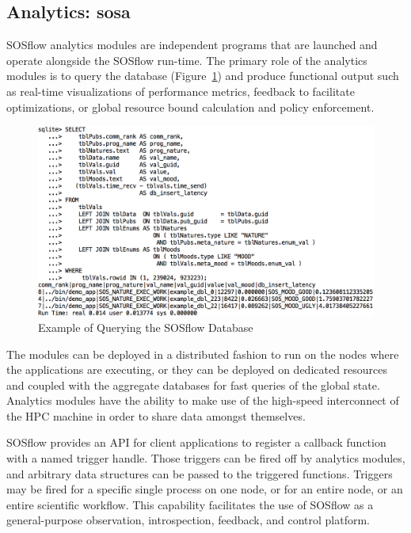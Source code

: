 \subsection{Analytics: sosa} %
%
SOSflow analytics modules are independent programs that are launched
and operate alongside the SOSflow run-time.
%
The primary role of the analytics modules is to query the database
(Figure~\ref{example_query}) and produce functional output such as
real-time visualizations of performance metrics, feedback to
facilitate optimizations, or global resource bound calculation and
policy enforcement.
%
\begin{figure}[h]
\centering
\includegraphics[width=\columnwidth]{images/query_example.png}
\caption{Example of Querying the SOSflow Database}
\label{example_query}
\end{figure}
%
The modules can be deployed in a distributed fashion to run on the nodes
where the applications are executing, or they can be deployed on dedicated
resources and coupled with the aggregate databases for fast queries
of the global state.
%
Analytics modules have the ability to make use of the high-speed
interconnect of the HPC machine in order to share data amongst themselves.
%
\par
%
SOSflow provides an API for client applications to register
a callback function with a named trigger handle.
%
Those triggers can be fired off by analytics modules, and arbitrary
data structures can be passed to the triggered functions.
%
Triggers may be fired for a specific single process on one node,
or for an entire node, or an entire scientific workflow.
%
This capability facilitates the use of SOSflow as a general-purpose observation,
introspection, feedback, and control platform.
